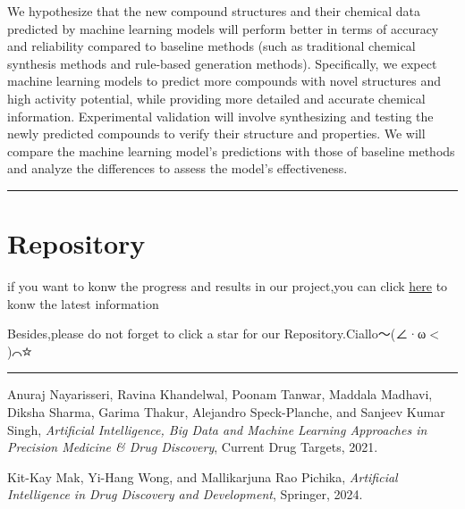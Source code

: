 \documentclass{ctexart}
\begin{document}
We hypothesize that the new compound structures and their chemical data predicted by machine learning models will perform better in terms of accuracy and reliability compared to baseline methods (such as traditional chemical synthesis methods and rule-based generation methods). Specifically, we expect machine learning models to predict more compounds with novel structures and high activity potential, while providing more detailed and accurate chemical information. Experimental validation will involve synthesizing and testing the newly predicted compounds to verify their structure and properties. We will compare the machine learning model’s predictions with those of baseline methods and analyze the differences to assess the model's effectiveness.


\vspace{1em}
\hrule
\section{Repository}
if you want to konw the progress and results in our project,you can click \href{https://github.com/Fully-ripe-mango/DeepLearningGroup/tree/main}{here} to konw the latest information

Besides,please do not forget to click a star for our Repository.Ciallo～(∠·ω$<$)⌒☆
\vspace{1em}
\hrule
\begin{thebibliography}{9}

    Anuraj Nayarisseri, Ravina Khandelwal, Poonam Tanwar, Maddala Madhavi, Diksha Sharma, Garima Thakur, Alejandro Speck-Planche, and Sanjeev Kumar Singh,
    \textit{Artificial Intelligence, Big Data and Machine Learning Approaches in Precision Medicine \& Drug Discovery}, 
    Current Drug Targets, 2021.
    
    Kit-Kay Mak, Yi-Hang Wong, and Mallikarjuna Rao Pichika,
    \textit{Artificial Intelligence in Drug Discovery and Development}, 
    Springer, 2024.

\end{thebibliography}
\end{document}
